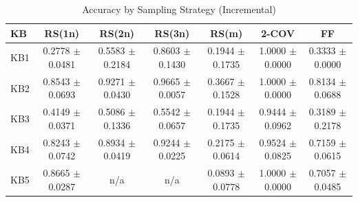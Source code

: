 \begin{table}[htbp]
\centering
\caption{Accuracy by Sampling Strategy (Incremental)}
\label{tab:accuracy_incremental}
\begin{tabular}{lcccccc}
\toprule
KB & RS(1n) & RS(2n) & RS(3n) & RS(m) & 2-COV & FF \\
\midrule
KB1 & 0.2778 $\pm$ 0.0481 & 0.5583 $\pm$ 0.2184 & 0.8603 $\pm$ 0.1430 & 0.1944 $\pm$ 0.1735 & 1.0000 $\pm$ 0.0000 & 0.3333 $\pm$ 0.0000 \\
KB2 & 0.8543 $\pm$ 0.0693 & 0.9271 $\pm$ 0.0430 & 0.9665 $\pm$ 0.0057 & 0.3667 $\pm$ 0.1528 & 1.0000 $\pm$ 0.0000 & 0.8134 $\pm$ 0.0688 \\
KB3 & 0.4149 $\pm$ 0.0371 & 0.5086 $\pm$ 0.1336 & 0.5542 $\pm$ 0.0657 & 0.1944 $\pm$ 0.1735 & 0.9444 $\pm$ 0.0962 & 0.3189 $\pm$ 0.2178 \\
KB4 & 0.8243 $\pm$ 0.0742 & 0.8934 $\pm$ 0.0419 & 0.9244 $\pm$ 0.0225 & 0.2175 $\pm$ 0.0614 & 0.9524 $\pm$ 0.0825 & 0.7159 $\pm$ 0.0615 \\
KB5 & 0.8665 $\pm$ 0.0287 & n/a & n/a & 0.0893 $\pm$ 0.0778 & 1.0000 $\pm$ 0.0000 & 0.7057 $\pm$ 0.0485 \\
\bottomrule
\end{tabular}
\end{table}

